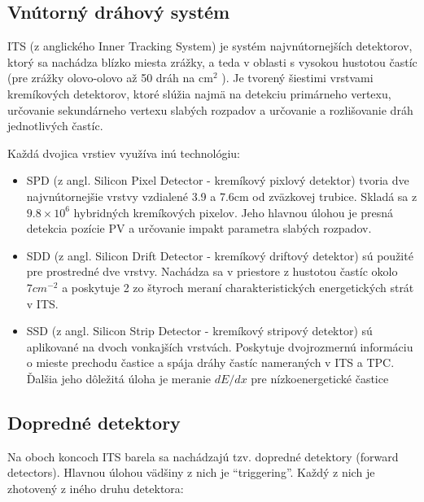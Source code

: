 \documentclass[thesismargins, thesislinespacing]{rnthesis}
\begin{document}
\subsection{Vnútorný dráhový systém}

ITS (z anglického Inner Tracking System) je systém najvnútornejších detektorov, ktorý sa nachádza blízko miesta zrážky, a teda v oblasti s vysokou hustotou častíc (pre zrážky olovo-olovo až 50 dráh na $\mathrm{cm}^2$ ). Je tvorený šiestimi vrstvami kremíkových detektorov, ktoré slúžia najmä na detekciu primárneho vertexu, určovanie sekundárneho vertexu slabých rozpadov a určovanie a rozlišovanie dráh jednotlivých častíc. 

Každá dvojica vrstiev využíva inú technológiu:
\begin{itemize}
	\item SPD (z angl. Silicon Pixel Detector - kremíkový pixlový detektor) tvoria dve najvnútornejšie vrstvy vzdialené 3.9 a 7.6cm od zväzkovej trubice. Skladá sa z $9.8\times10^6$ hybridných kremíkových pixelov. Jeho hlavnou úlohou je presná detekcia pozície PV a určovanie impakt parametra slabých rozpadov.  
	\item SDD (z angl. Silicon Drift Detector - kremíkový driftový detektor) sú použité pre prostredné dve vrstvy. Nachádza sa v priestore z hustotou častíc okolo $7cm^{-2}$ a poskytuje 2 zo štyroch meraní charakteristických energetických strát v ITS.
	\item SSD (z angl. Silicon Strip Detector - kremíkový stripový detektor) sú aplikované na dvoch vonkajších vrstvách. Poskytuje dvojrozmernú informáciu o mieste prechodu častice a spája dráhy častíc nameraných v ITS a TPC. Ďalšia jeho dôležitá úloha je meranie $dE/dx$ pre nízkoenergetické častice 
\end{itemize}

\subsection{Dopredné detektory}

Na oboch koncoch ITS barela sa nachádzajú tzv. dopredné detektory (forward detectors). Hlavnou úlohou vädšiny z nich je “triggering”. Každý z nich je zhotovený z iného druhu detektora:
\end{document}
